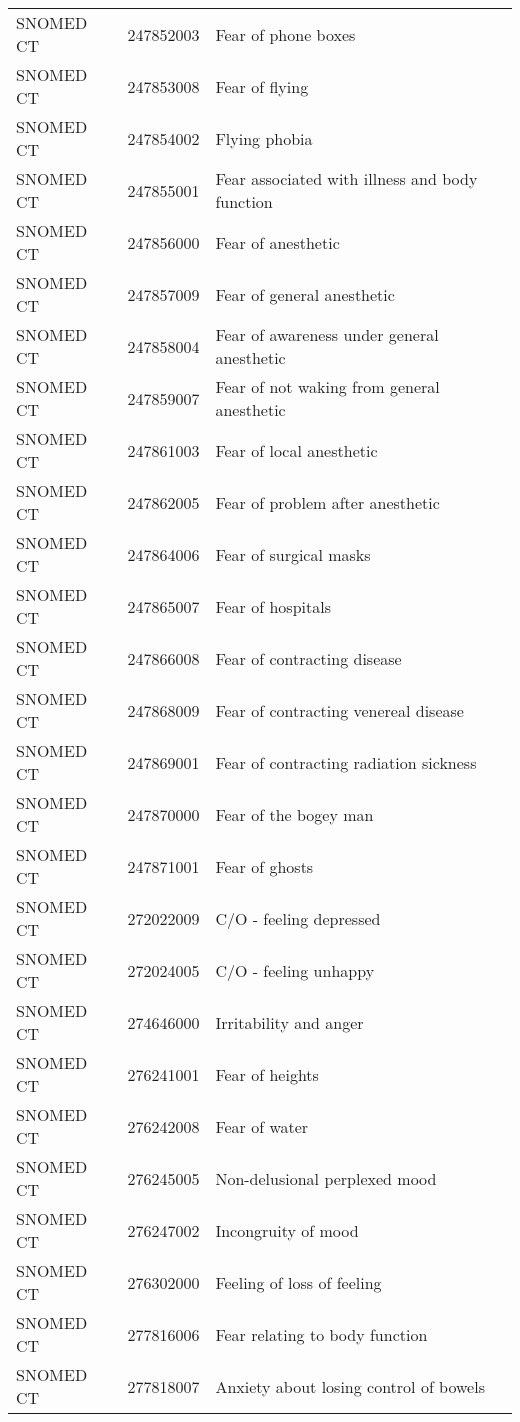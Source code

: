 \begin{longtable}{p{}p{}p{}}
  SNOMED CT & 247852003 & Fear of phone boxes \\ 
  SNOMED CT & 247853008 & Fear of flying \\ 
  SNOMED CT & 247854002 & Flying phobia \\ 
  SNOMED CT & 247855001 & Fear associated with illness and body function \\ 
  SNOMED CT & 247856000 & Fear of anesthetic \\ 
  SNOMED CT & 247857009 & Fear of general anesthetic \\ 
  SNOMED CT & 247858004 & Fear of awareness under general anesthetic \\ 
  SNOMED CT & 247859007 & Fear of not waking from general anesthetic \\ 
  SNOMED CT & 247861003 & Fear of local anesthetic \\ 
  SNOMED CT & 247862005 & Fear of problem after anesthetic \\ 
  SNOMED CT & 247864006 & Fear of surgical masks \\ 
  SNOMED CT & 247865007 & Fear of hospitals \\ 
  SNOMED CT & 247866008 & Fear of contracting disease \\ 
  SNOMED CT & 247868009 & Fear of contracting venereal disease \\ 
  SNOMED CT & 247869001 & Fear of contracting radiation sickness \\ 
  SNOMED CT & 247870000 & Fear of the bogey man \\ 
  SNOMED CT & 247871001 & Fear of ghosts \\ 
  SNOMED CT & 272022009 & C/O - feeling depressed \\ 
  SNOMED CT & 272024005 & C/O - feeling unhappy \\ 
  SNOMED CT & 274646000 & Irritability and anger \\ 
  SNOMED CT & 276241001 & Fear of heights \\ 
  SNOMED CT & 276242008 & Fear of water \\ 
  SNOMED CT & 276245005 & Non-delusional perplexed mood \\ 
  SNOMED CT & 276247002 & Incongruity of mood \\ 
  SNOMED CT & 276302000 & Feeling of loss of feeling \\ 
  SNOMED CT & 277816006 & Fear relating to body function \\ 
  SNOMED CT & 277818007 & Anxiety about losing control of bowels \\ 

\end{longtable}
